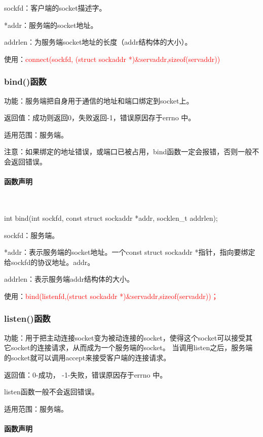 \documentclass[UTF8]{article}%
\begin{document}
sockfd：客户端的socket描述字。

*addr：服务端的socket地址。

addrlen：为服务端socket地址的长度（addr结构体的大小）。

使用：\textcolor{red}{connect(sockfd, (struct sockaddr *)\&servaddr,sizeof(servaddr))}

\subsubsection{bind()函数}

功能：服务端把自身用于通信的地址和端口绑定到socket上。

返回值：成功则返回0，失败返回-1，错误原因存于errno 中。

适用范围：服务端。

注意：如果绑定的地址错误，或端口已被占用，bind函数一定会报错，否则一般不会返回错误。

\paragraph{函数声明}~{}

int bind(int sockfd, const struct sockaddr *addr, socklen\_t addrlen);

sockfd：服务端。

*addr：表示服务端的socket地址。一个const struct sockaddr *指针，指向要绑定给sockfd的协议地址。addr。

addrlen：表示服务端addr结构体的大小。

使用：\textcolor{red}{bind(listenfd,(struct sockaddr *)\&servaddr,sizeof(servaddr))；}

\subsubsection{listen()函数}

功能：用于把主动连接socket变为被动连接的socket，使得这个socket可以接受其它socket的连接请求，从而成为一个服务端的socket。 当调用listen之后，服务端的socket就可以调用accept来接受客户端的连接请求。

返回值：0-成功， -1-失败，错误原因存于errno 中。

listen函数一般不会返回错误。

适用范围：服务端。

\paragraph{函数声明}~{}
\end{document}
